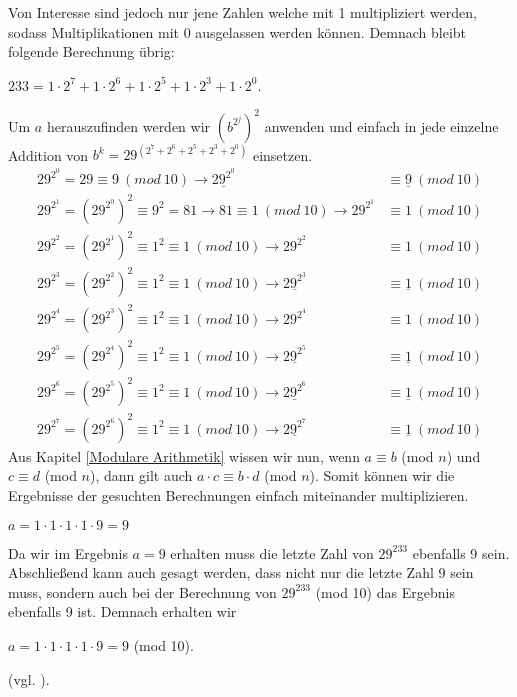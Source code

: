 \documentclass[12pt,a4paper]{article}
\theoremstyle{definition}
\begin{document}
Von Interesse sind jedoch nur jene Zahlen welche mit 1 multipliziert werden, sodass Multiplikationen mit 0 ausgelassen werden können.
Demnach bleibt folgende Berechnung übrig:
\begin{center}
$233 = 1 \cdot 2^7 + 1 \cdot 2^6 + 1 \cdot2^5 + 1 \cdot 2^3 + 1 \cdot 2^0$.
\end{center}

Um $a$ herauszufinden werden wir $(b^{2^j})^2$ anwenden und einfach in jede einzelne Addition von $b^k = 29^{(2^7 + 2^6 + 2^5 + 2^3 + 2^0)}$ einsetzen.
\begin{align}
29^{2^0} = 29 \equiv 9\ (mod\ 10)                           \rightarrow \underline{29^{2^0}} &\equiv \underline{9}\ (mod\ 10) \\
29^{2^1} = (29^{2^0})^2 \equiv 9^2 = 81 \rightarrow 81 \equiv 1\ (mod\ 10) \rightarrow 29^{2^1} &\equiv 1\ (mod\ 10) \\
29^{2^2} = (29^{2^1})^2 \equiv 1^2 \equiv 1\ (mod\ 10) \rightarrow 29^{2^2} &\equiv 1\ (mod\ 10) \\
29^{2^3} = (29^{2^2})^2 \equiv 1^2 \equiv 1\ (mod\ 10) \rightarrow \underline{29^{2^3}} &\equiv \underline{1}\ (mod\ 10) \\
29^{2^4} = (29^{2^3})^2 \equiv 1^2 \equiv 1\ (mod\ 10) \rightarrow 29^{2^4} &\equiv 1\ (mod\ 10) \\
29^{2^5} = (29^{2^4})^2 \equiv 1^2 \equiv 1\ (mod\ 10) \rightarrow \underline{29^{2^5}} &\equiv \underline{1}\ (mod\ 10) \\
29^{2^6} = (29^{2^5})^2 \equiv 1^2 \equiv 1\ (mod\ 10) \rightarrow \underline{29^{2^6}} &\equiv \underline{1}\ (mod\ 10) \\
29^{2^7} = (29^{2^6})^2 \equiv 1^2 \equiv 1\ (mod\ 10) \rightarrow \underline{29^{2^7}} &\equiv \underline{1}\ (mod\ 10)
\end{align}
Aus Kapitel \ref{Modulare Arithmetik} wissen wir nun, wenn $a\equiv b$ (mod $n$) und $c\equiv d$ (mod $n$), dann gilt auch $a \cdot c\equiv b \cdot d$ (mod $n$).
Somit können wir die Ergebnisse der gesuchten Berechnungen einfach miteinander multiplizieren.
\begin{center}
$a = 1 \cdot 1 \cdot 1 \cdot 1 \cdot 9 = 9$
\end{center}
Da wir im Ergebnis $a = 9$ erhalten muss die letzte Zahl von $29^{233}$ ebenfalls 9 sein.
Abschließend kann auch gesagt werden, dass nicht nur die letzte Zahl 9 sein muss, sondern auch bei der Berechnung von $29^{233}$ (mod 10) das Ergebnis ebenfalls 9 ist.
Demnach erhalten wir 
\begin{center}
$a = 1 \cdot 1 \cdot 1 \cdot 1 \cdot 9 = 9$ (mod 10).
\end{center}
(vgl. \cite[122]{Arndt2000}).
\end{document}
